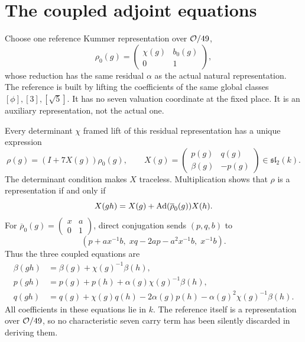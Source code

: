\section{The coupled adjoint equations}\label{sec:deformation}
Choose one reference Kummer representation over $\mathcal O/49$,
\begin{equation}\label{eq:rho0}
\rho_0(g)=\begin{pmatrix}\chi(g)&b_0(g)\\0&1\end{pmatrix},
\end{equation}
whose reduction has the same residual $\alpha$ as the actual natural representation. The reference is built by lifting the coefficients of the same global classes $[\phi],[3],[\sqrt5]$. It has no seven valuation coordinate at the fixed place. It is an auxiliary representation, not the actual one.

Every determinant $\chi$ framed lift of this residual representation has a unique expression
\begin{equation}\label{eq:adjoint}
\rho(g)=(I+7X(g))\rho_0(g),\qquad
X(g)=\begin{pmatrix}p(g)&q(g)\\\beta(g)&-p(g)\end{pmatrix}\in\mathfrak{sl}_2(k).
\end{equation}
The determinant condition makes $X$ traceless. Multiplication shows that $\rho$ is a representation if and only if
\[
X(gh)=X(g)+\operatorname{Ad}(\overline\rho_0(g))X(h).
\]
For $\overline\rho_0(g)=\left(\begin{smallmatrix}x&a\\0&1\end{smallmatrix}\right)$, direct conjugation sends $(p,q,b)$ to
\[
(p+ax^{-1}b,\;xq-2ap-a^2x^{-1}b,\;x^{-1}b).
\]
Thus the three coupled equations are
\begin{align}
\beta(gh)&=\beta(g)+\chi(g)^{-1}\beta(h),\label{eq:beta-cocycle}\\
p(gh)&=p(g)+p(h)+\alpha(g)\chi(g)^{-1}\beta(h),\label{eq:p-cocycle}\\
q(gh)&=q(g)+\chi(g)q(h)-2\alpha(g)p(h)
-\alpha(g)^2\chi(g)^{-1}\beta(h).\label{eq:q-cocycle}
\end{align}
All coefficients in these equations lie in $k$. The reference itself is a representation over $\mathcal O/49$, so no characteristic seven carry term has been silently discarded in deriving them.

